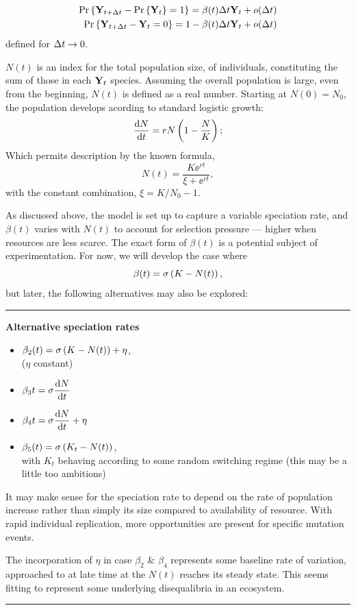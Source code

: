\begin{align}
\label{cases1}
\begin{split}
{\text{Pr}\left\{{\bf Y}_{t+\Delta t} - {\text{Pr}\left\{{{\bf Y}_t}\right\}} = 1\right\}} = \beta(t)\Delta t{{\bf Y}_t} + o(\Delta t)\\
{\text{Pr}\left\{{\bf Y}_{t+\Delta t} - {{\bf Y}_t} = 0\right\}} = 1 -  \beta(t)\Delta t{{\bf Y}_t} + o(\Delta t)
\end{split}
\end{align}
defined for $\Delta t\to 0$. \par
$N(t)$ is an index for the total population size, of individuals, constituting the sum of those in each ${{\bf Y}_t}$ species. Assuming the overall population is large, even from the beginning, $N(t)$ is defined as a real number. Starting at $N(0) = N_0$, the population develops acording to standard logistic growth: 
$$\displaystyle\frac{{\rm d} N}{{\rm d} t} = rN\left(1 - \frac{N}{K}\right);$$
Which permits description by the known formula, 
$$N(t) = \frac{K\ee^{rt}}{\xi + \ee^{rt}},$$
with the constant combination, $\xi = K/N_0 - 1$.\par
As discussed above, the model is set up to capture a variable speciation rate, and $\beta(t)$ varies with $N(t)$ to account for selection pressure --- higher when resources are less scarce. The exact form of $\beta(t)$ is a potential subject of experimentation. For now, we will  develop the case where
\begin{equation}
\label{basicRate1}
\beta(t) = \sigma\left( K-N(t)\right),
\end{equation}
but later, the following alternatives may also be explored:
\vspace{10pt}
\hrule
\vspace{10pt}
\noindent
\textbf{Alternative speciation rates}
\begin{itemize}
\item $\beta_2(t) = \sigma\left( K-N(t)\right) + \eta$,\\ ($\eta$ constant)
\item $\beta_3{t} = \sigma \displaystyle\frac{{\rm d} N}{{\rm d} t}$
\item $\beta_4{t} = \sigma \displaystyle\frac{{\rm d} N}{{\rm d} t} + \eta$
\item $\beta_5(t) = \sigma\left( K_t-N(t)\right)$,\\ with $K_t$ behaving according to some random switching regime (this may be a little too ambitions)
\end{itemize}
It may make sense for the speciation rate to depend on the rate of population increase rather than simply its size compared to availability of resource. With rapid individual replication, more opportunities are present for specific mutation events.\par
The incorporation of $\eta$ in case $\beta_2$ \& $\beta_4$ represents some baseline rate of variation, approached to at late time at the $N(t)$ reaches its steady state. This seems fitting to represent some underlying disequalibria in an ecosystem.  
\vspace{10pt}
\hrule
\vspace{10pt}

